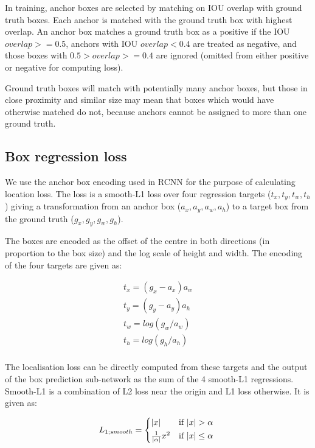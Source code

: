In training, anchor boxes are selected by matching on \gls{IOU} overlap with ground truth boxes. Each anchor is matched with the ground truth box with highest overlap. An anchor box matches a ground truth box as a positive if the IOU $ overlap >= 0.5 $, anchors with IOU $ overlap < 0.4 $ are treated as negative, and those boxes with $ 0.5 > overlap >= 0.4 $ are ignored (omitted from either positive or negative for computing loss).

Ground truth boxes will match with potentially many anchor boxes, but those in close proximity and similar size may mean that boxes which would have otherwise matched do not, because anchors cannot be assigned to more than one ground truth.

\subsection {Box regression loss}
\label{sec:regression}


We use the anchor box encoding used in \gls{RCNN} \cite{Wang2017} for the purpose of calculating location loss. The loss is a smooth-L1 loss over four regression targets ($t_x, t_y, t_w, t_h$) giving a transformation from an anchor box ($a_x, a_y, a_w, a_h$)  to a target box from the ground truth ($g_x, g_y, g_w, g_h$). 

The boxes are encoded as the offset of the centre in both directions (in proportion to the box size) and the log scale of height and width. The encoding of the four targets are given as:

\begin{equation}
\begin{split}
t_x = (g_x - a_x) a_w\\
t_y = (g_y - a_y) a_h\\
t_w = log(g_w / a_w)\\
t_h = log(g_h / a_h)\\
\end{split}
\label{eq:encoding_rcnn}
\end{equation}

The localisation loss can be directly computed from these targets and the output of the box prediction sub-network as the sum of the 4 smooth-L1 regressions. Smooth-L1 is a combination of L2 loss near the origin and L1 loss otherwise. It is given as:

\begin{equation}
L_{1;smooth} = 
\begin{cases*}
|x| & if $|x|>\alpha $ \\
\frac{1}{|\alpha|}x^2 & if $|x| \leq \alpha$
\end{cases*}
\label{eq:smooth_l1}
\end{equation}

